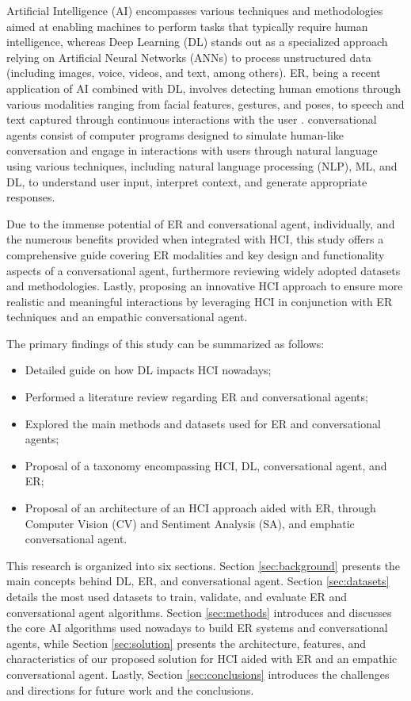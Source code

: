 \documentclass[runningheads]{llncs}
\begin{document}
Artificial Intelligence (AI) encompasses various techniques and methodologies aimed at enabling machines to perform tasks that typically require human intelligence, whereas Deep Learning (DL) stands out as a specialized approach relying on Artificial Neural Networks (ANNs) to process unstructured data (including images, voice, videos, and text, among others). ER, being a recent application of AI combined with DL, involves detecting human emotions through various modalities ranging from facial features, gestures, and poses, to speech and text captured through continuous interactions with the user \cite{alrowais_modified_2023}.  conversational agents consist of computer programs designed to simulate human-like conversation and engage in interactions with users through natural language using various techniques, including natural language processing (NLP), ML, and DL, to understand user input, interpret context, and generate appropriate responses.
 
Due to the immense potential of ER and conversational agent, individually, and the numerous benefits provided when integrated with HCI, this study offers a comprehensive guide covering ER modalities and key design and functionality aspects of a conversational agent, furthermore reviewing widely adopted datasets and methodologies. Lastly, proposing an innovative HCI approach to ensure more realistic and meaningful interactions by leveraging HCI in conjunction with ER techniques and an empathic conversational agent.
 
The primary findings of this study can be summarized as follows:
\begin{itemize}
	\item Detailed guide on how DL impacts HCI nowadays;
	\item Performed a literature review regarding ER and conversational agents;
	\item Explored the main methods and datasets used for ER and conversational agents;
	\item Proposal of a taxonomy encompassing HCI, DL, conversational agent, and ER;
	\item Proposal of an architecture of an HCI approach aided with ER, through Computer Vision (CV) and Sentiment Analysis (SA), and emphatic conversational agent.
\end{itemize}

This research is organized into six sections. Section \ref{sec:background} presents the main concepts behind DL, ER, and conversational agent. Section \ref{sec:datasets} details the most used datasets to train, validate, and evaluate ER and conversational agent algorithms. Section \ref{sec:methods} introduces and discusses the core AI algorithms used nowadays to build ER systems and conversational agents, while Section \ref{sec:solution} presents the architecture, features, and characteristics of our proposed solution for HCI aided with ER and an empathic conversational agent. Lastly, Section \ref{sec:conclusions}  introduces the challenges and directions for future work and the conclusions. 
\end{document}
